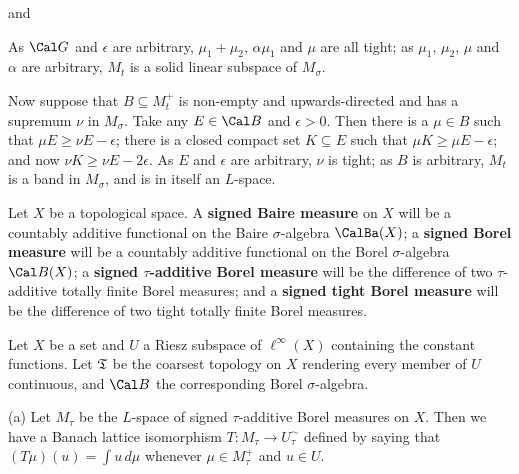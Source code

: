 {


\noindent and


\noindent As $\Cal G$ and $\epsilon$ are arbitrary, $\mu_1+\mu_2$,
$\alpha\mu_1$ and $\mu$ are all tight;  as $\mu_1$, $\mu_2$, $\mu$ and
$\alpha$ are arbitrary, $M_t$ is a solid linear subspace of $M_{\sigma}$.

Now suppose that $B\subseteq M_t^+$ is non-empty and
upwards-directed and has a supremum $\nu$ in $M_{\sigma}$.   Take any
$E\in\Cal B$ and $\epsilon>0$.   Then there is a $\mu\in B$ such that
$\mu E\ge\nu E-\epsilon$;  there is a closed compact set $K\subseteq E$
such that $\mu K\ge\mu E-\epsilon$;  and now $\nu K\ge\nu E-2\epsilon$.
As $E$ and $\epsilon$ are arbitrary, $\nu$ is tight;  as $B$ is
arbitrary, $M_t$ is a band in $M_{\sigma}$, and is in itself an
$L$-space.
}%

 Let $X$ be a topological space.   A {\bf
signed Baire measure} on $X$ will be a countably additive functional on
the Baire
$\sigma$-algebra $\CalBa(X)$;
a {\bf signed Borel measure} will be a countably additive functional on
the Borel $\sigma$-algebra $\Cal B(X)$;  a {\bf signed $\tau$-additive Borel measure} will
be the difference of two $\tau$-additive totally finite
Borel measures;  and a {\bf signed
tight Borel measure} will be
the difference of two tight totally finite Borel measures.

 Let $X$ be a set and $U$ a Riesz subspace of
$\ell^{\infty}(X)$ containing the constant functions.   Let $\frak T$ be
the coarsest topology on $X$ rendering every member of $U$ continuous,
and $\Cal B$ the corresponding Borel $\sigma$-algebra.

(a) Let $M_{\tau}$ be the $L$-space of signed
$\tau$-additive Borel measures on $X$.   Then we have a Banach
lattice isomorphism $T:M_{\tau}\to U^{\sim}_{\tau}$ defined by saying
that $(T\mu)(u)=\int u\,d\mu$ whenever $\mu\in M_{\tau}^+$ and $u\in U$.

